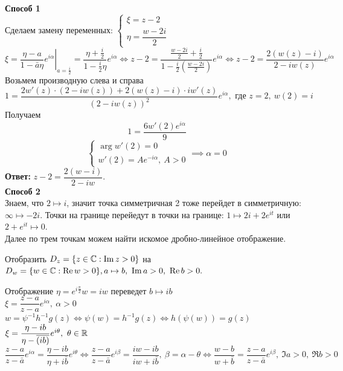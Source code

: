 	\textbf{Способ 1}\\
	Сделаем замену переменных:
	$ \begin{cases}
		\xi = z - 2\\ 
		\eta = \dfrac{w - 2i}{2}
	\end{cases} $
	\[ \xi =\left.\frac{\eta - a}{1 - \bar a\eta} e^{i\alpha} \right|_{a=\frac{i}{2}} = \frac{\eta + \frac{i}{2}}{1 - \frac{i}{2}\eta}e^{i \alpha} \iff z - 2 = \frac{\frac{w - 2i}{2} + \frac{i}{2}}{1 - \frac{i}{2}(\frac{w - 2i}{2})}e^{i \alpha} \iff z - 2 = \frac{2(w(z) - i)}{2 - iw(z)}e^{i\alpha} \]
	Возьмем производную слева и справа
	\[1 = \frac{2w'(z)\cdot(2 - iw(z)) + 2(w(z) - i)\cdot iw'(z)}{(2 - iw(z))^2}e^{i\alpha}, \text{ где } z = 2,\ w(2) = i\]
	Получаем
	\[ 1 = \frac{6w'(2)e^{i \alpha}}{9} \]
	\[ \begin{cases}
			\arg w'(2) = 0\\ 
			w'(2) = Ae^{-i\alpha}, \ A > 0
		\end{cases} \implies \alpha = 0 \]
	\textbf{Ответ: } $z - 2 = \dfrac{2(w - i)}{2 - iw}$. \\ 
	\textbf{Способ 2}\\
	Знаем, что $ 2 \mapsto i $, значит точка симметричная 2 тоже перейдет в симметричную: 
	$ \infty \mapsto -2i $. Точки на границе перейедут в точки на границе: $ 1 \mapsto 2i+2e^{it} $ или $ 2+e^{it} \mapsto 0 $.\\
	Далее по трем точкам можем найти искомое дробно-линейное отображение.
	\newpage
	\begin{example}
		Отобразить $ D_z = \{z \in \mathbb{C}: \operatorname{Im} z>0\} $ на $ D_w = \{w \in \mathbb{C}: \operatorname{Re} w>0\},\\ a \mapsto b,\ \operatorname{Im} a>0,\ \operatorname{Re} b>0. $
	\end{example}
	\noindent
	Отображение $ \eta = e^{i\frac{\pi}{2}}w = iw \text{ переведет } b\mapsto ib $\\
	$ \xi = \dfrac{z-a}{z-a}e^{i\alpha},\ \alpha > 0 $\\
	$ w = \psi^{-1}h^{-1}g(z) \iff \psi(w) = h^{-1}g(z) \iff h(\psi(w)) = g(z) $\\
	$ \xi = \dfrac{\eta - ib}{\eta - \overline{(ib)}}e^{i\theta},\ \theta\in\mathbb{R} $
	\[ \frac{z - a}{z - \bar a}e^{i\alpha} = \frac{\eta - ib}{\eta + i\bar b}e^{i\theta} \iff \frac{z - a}{z - \bar a}e^{i\beta} = \frac{iw - ib}{iw + i\bar b}, \ \beta = \alpha - \theta \iff \frac{w - b}{w + \bar b} = \frac{z - a}{z - \bar a}e^{i\beta},\ \Im a>0,\ \Re b>0 \]
